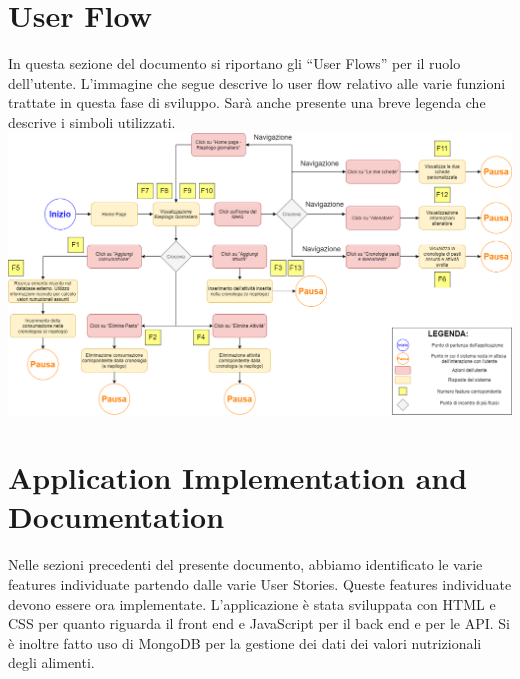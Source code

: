 \documentclass{article}
\begin{document}
   \section{User Flow}
   In questa sezione del documento si riportano gli “User Flows” per il ruolo dell’utente. L’immagine che segue descrive lo user flow relativo alle varie funzioni trattate in questa fase di sviluppo. Sarà anche presente una breve legenda che descrive i simboli utilizzati.\\
   \includegraphics[scale=0.4]{User Flow.drawio.png}
   \section{Application Implementation and Documentation}
   Nelle sezioni precedenti del presente documento, abbiamo identificato le varie features individuate partendo dalle varie User Stories. Queste features individuate devono essere ora implementate. L’applicazione è stata sviluppata con HTML e CSS per quanto riguarda il front end e JavaScript per il back end e per le API. Si è inoltre fatto uso di MongoDB per la gestione dei dati dei valori nutrizionali degli alimenti.
\end{document}

